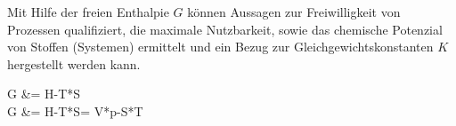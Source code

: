 \begin{itemize}
	Mit Hilfe der freien Enthalpie $G$ können Aussagen zur Freiwilligkeit von \linebreak Prozessen qualifiziert, die maximale Nutzbarkeit, sowie das chemische \linebreak Potenzial von Stoffen (Systemen) ermittelt und ein Bezug zur \linebreak Gleichgewichtskonstanten $K$ hergestellt werden kann.
	\begin{flalign}
	G	&= H-T*S\\
	\diff G &= \diff H-T*\diff S= V*\diff p-S*\diff T
	\end{flalign}
\end{itemize}
